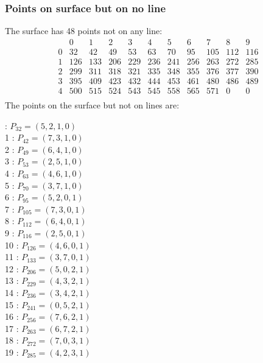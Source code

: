 \documentclass{article}
\begin{document}
{\subsubsection*{Points on surface but on no line}
The surface has 48 points not on any line:\\
$$
\begin{array}{r|*{10}{r}}
 & 0 & 1 & 2 & 3 & 4 & 5 & 6 & 7 & 8 & 9\\
\hline
0 & 32 & 42 & 49 & 53 & 63 & 70 & 95 & 105 & 112 & 116\\
1 & 126 & 133 & 206 & 229 & 236 & 241 & 256 & 263 & 272 & 285\\
2 & 299 & 311 & 318 & 321 & 335 & 348 & 355 & 376 & 377 & 390\\
3 & 395 & 409 & 423 & 432 & 444 & 453 & 461 & 480 & 486 & 489\\
4 & 500 & 515 & 524 & 543 & 545 & 558 & 565 & 571 & 0 & 0\\
\end{array}
$$
The points on the surface but not on lines are:\\
\begin{multicols}{2}
 : $P_{32}=( 5, 2, 1, 0 )$\\
1 : $P_{42}=( 7, 3, 1, 0 )$\\
2 : $P_{49}=( 6, 4, 1, 0 )$\\
3 : $P_{53}=( 2, 5, 1, 0 )$\\
4 : $P_{63}=( 4, 6, 1, 0 )$\\
5 : $P_{70}=( 3, 7, 1, 0 )$\\
6 : $P_{95}=( 5, 2, 0, 1 )$\\
7 : $P_{105}=( 7, 3, 0, 1 )$\\
8 : $P_{112}=( 6, 4, 0, 1 )$\\
9 : $P_{116}=( 2, 5, 0, 1 )$\\
10 : $P_{126}=( 4, 6, 0, 1 )$\\
11 : $P_{133}=( 3, 7, 0, 1 )$\\
12 : $P_{206}=( 5, 0, 2, 1 )$\\
13 : $P_{229}=( 4, 3, 2, 1 )$\\
14 : $P_{236}=( 3, 4, 2, 1 )$\\
15 : $P_{241}=( 0, 5, 2, 1 )$\\
16 : $P_{256}=( 7, 6, 2, 1 )$\\
17 : $P_{263}=( 6, 7, 2, 1 )$\\
18 : $P_{272}=( 7, 0, 3, 1 )$\\
19 : $P_{285}=( 4, 2, 3, 1 )$\\

\end{multicols}}
\end{document}
